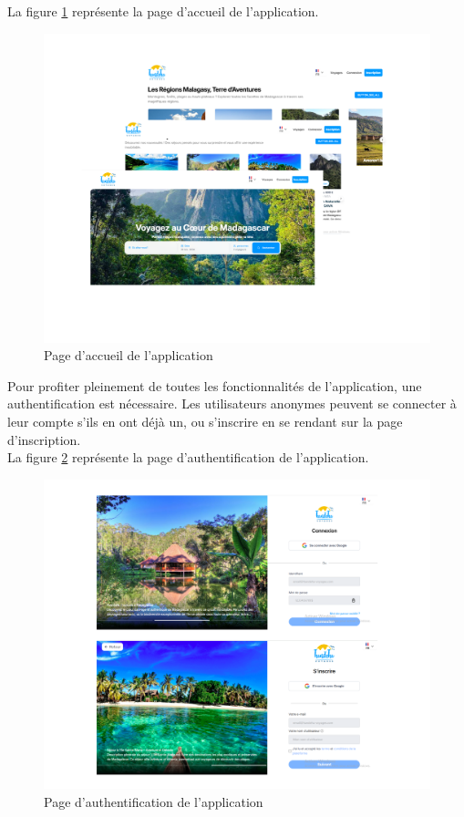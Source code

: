 \documentclass[12pt]{report}
\begin{document}
			La figure \ref{fig:pageAccueil} représente la page d’accueil de l’application.

			\begin{figure}[h]
				\centering
				\includegraphics[width=\textwidth]{pageAccueil.png}
				\caption{Page d’accueil de l’application}
				\label{fig:pageAccueil}
			\end{figure}
			\FloatBarrier

			Pour profiter pleinement de toutes les fonctionnalités de l'application, une authentification est nécessaire. Les utilisateurs anonymes peuvent se connecter à leur compte s'ils en ont déjà un, ou s'inscrire en se rendant sur la page d'inscription.\\

			La figure \ref{fig:authPage} représente la page d’authentification de l’application.

			\begin{figure}[h]
				\centering
				\includegraphics[width=\textwidth]{authPage.png}
				\caption{Page d’authentification de l’application}
				\label{fig:authPage}
			\end{figure}
			\FloatBarrier
\end{document}

